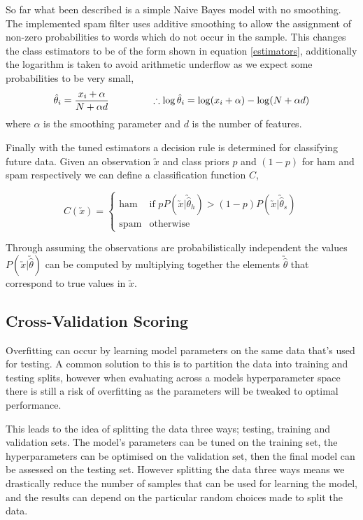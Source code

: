 \documentclass[12pt, a4paper]{article}
\begin{document}
  So far what been described is a simple Naive Bayes model with no smoothing. The implemented spam filter uses additive smoothing to allow the assignment of non-zero probabilities to words which do not occur in the sample. This changes the class estimators to be of the form shown in equation \ref{estimators}, additionally the logarithm is taken to avoid arithmetic underflow as we expect some probabilities to be very small,
  \begin{equation} \label{estimators}
		\hat{\theta}_i = \frac{x_i + \alpha}{N + \alpha d}
		\hspace{1.5cm}
		\therefore \log \hat{\theta}_i = \log(x_i + \alpha) - \log(N + \alpha d)
	\end{equation}
  where $\alpha$ is the smoothing parameter and $d$ is the number of features.

  Finally with the tuned estimators a decision rule is determined for classifying future data. Given an observation $\utilde{x}$ and class priors $p$ and $(1-p)$ for ham and spam respectively we can define a classification function $C$,

  $$
    C(\utilde{x}) = \begin{cases}
      \text{ham} & \text{if } p P(\utilde{x}|\utilde{\hat{\theta}}_h) > (1-p) P(\utilde{x}|\utilde{\hat{\theta}}_s) \\
      \text{spam}  & \text{otherwise}
    \end{cases}
  $$

  Through assuming the observations are probabilistically independent the values $P(\utilde{x}|\utilde{\hat{\theta}})$ can be computed by multiplying together the elements $\utilde{\hat{\theta}}$ that correspond to true values in $\utilde{x}$.


  \subsection{Cross-Validation Scoring}

  Overfitting can occur by learning model parameters on the same data that's used for testing. A common solution to this is to partition the data into training and testing splits, however when evaluating across a models hyperparameter space there is still a risk of overfitting as the parameters will be tweaked to optimal performance.

  This leads to the idea of splitting the data three ways; testing, training and validation sets. The model's parameters can be tuned on the training set, the hyperparameters can be optimised on the validation set, then the final model can be assessed on the testing set. However splitting the data three ways means we drastically reduce the number of samples that can be used for learning the model, and the results can depend on the particular random choices made to split the data.
\end{document}
